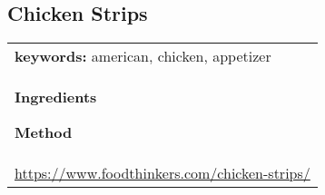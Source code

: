 \documentclass[../web-recipes.tex]{subfiles}
\begin{document}
    \renewcommand{\mytitle}{Chicken Strips}
    \renewcommand{\myurl}{https://www.foodthinkers.com/chicken-strips/}

    \begin{mdframed}[nobreak]
      \section{\mytitle}
      \begin{tabular}{l}
      {\sffamily\footnotesize \textbf{keywords:}
        american, chicken, appetizer
      } \vspace{0.5ex}\\
        \begin{minipage}[t]{0.35\textwidth}
          {\sffamily\bfseries Ingredients}\vspace{0.5ex}
          
        \end{minipage}
        \qquad
        \begin{minipage}[t]{0.55\textwidth}
          {\sffamily\bfseries Method}\vspace{0.5ex}
          
        \end{minipage} \vspace{3ex}\\
        \multicolumn{1}{c}{\small\ttfamily \url{\myurl}} \\
      \end{tabular}
    \end{mdframed}
    
\end{document}

